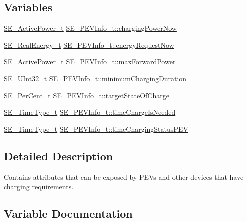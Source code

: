 \subsection*{Variables}
\begin{DoxyCompactItemize}
\item 
\hyperlink{structSE__ActivePower__t}{S\+E\+\_\+\+Active\+Power\+\_\+t} \hyperlink{group__PEVInfo_ga0ef709bf9f4b4b2157b2c82ef43d39aa}{S\+E\+\_\+\+P\+E\+V\+Info\+\_\+t\+::charging\+Power\+Now}
\item 
\hyperlink{structSE__RealEnergy__t}{S\+E\+\_\+\+Real\+Energy\+\_\+t} \hyperlink{group__PEVInfo_gad47c45664492878b0b3afc247a5d5522}{S\+E\+\_\+\+P\+E\+V\+Info\+\_\+t\+::energy\+Request\+Now}
\item 
\hyperlink{structSE__ActivePower__t}{S\+E\+\_\+\+Active\+Power\+\_\+t} \hyperlink{group__PEVInfo_ga7c062430150ff29489e36e8d96e0b12c}{S\+E\+\_\+\+P\+E\+V\+Info\+\_\+t\+::max\+Forward\+Power}
\item 
\hyperlink{group__UInt32_ga70bd4ecda3c0c85d20779d685a270cdb}{S\+E\+\_\+\+U\+Int32\+\_\+t} \hyperlink{group__PEVInfo_ga5f6d6597c160908cc295b6d1392e9225}{S\+E\+\_\+\+P\+E\+V\+Info\+\_\+t\+::minimum\+Charging\+Duration}
\item 
\hyperlink{group__PerCent_ga14278cbee754c63496035b722b417ddc}{S\+E\+\_\+\+Per\+Cent\+\_\+t} \hyperlink{group__PEVInfo_ga36d8d6c62de4e5fe59431faa1f847189}{S\+E\+\_\+\+P\+E\+V\+Info\+\_\+t\+::target\+State\+Of\+Charge}
\item 
\hyperlink{group__TimeType_ga6fba87a5b57829b4ff3f0e7638156682}{S\+E\+\_\+\+Time\+Type\+\_\+t} \hyperlink{group__PEVInfo_ga2f882d30896a2cc714f4e3c852e4fc74}{S\+E\+\_\+\+P\+E\+V\+Info\+\_\+t\+::time\+Charge\+Is\+Needed}
\item 
\hyperlink{group__TimeType_ga6fba87a5b57829b4ff3f0e7638156682}{S\+E\+\_\+\+Time\+Type\+\_\+t} \hyperlink{group__PEVInfo_ga3c4bef34dcb71114ec8bc685a1df5280}{S\+E\+\_\+\+P\+E\+V\+Info\+\_\+t\+::time\+Charging\+Status\+P\+EV}
\end{DoxyCompactItemize}


\subsection{Detailed Description}
Contains attributes that can be exposed by P\+E\+Vs and other devices that have charging requirements. 

\subsection{Variable Documentation}
\mbox{\label{group__PEVInfo_ga0ef709bf9f4b4b2157b2c82ef43d39aa}} 

